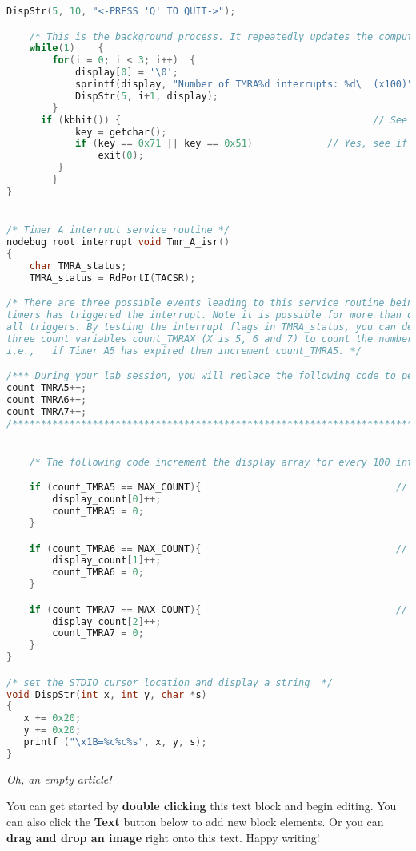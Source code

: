 \begin{lstlisting}[language=C]
   DispStr(5, 10, "<-PRESS 'Q' TO QUIT->");

	/* This is the background process. It repeatedly updates the computer monitor with the values in the display_count array */
	while(1)	{
		for(i = 0; i < 3; i++)	{
			display[0] = '\0';
			sprintf(display, "Number of TMRA%d interrupts: %d\  (x100)",i+5, display_count[i]);
			DispStr(5, i+1, display);
		}
      if (kbhit()) {											// See if key has been pressed
			key = getchar();
			if (key == 0x71 || key == 0x51)				// Yes, see if it's the q or Q key
				exit(0);
         }
 		}
}


/* Timer A interrupt service routine */
nodebug root interrupt void Tmr_A_isr()
{
	char TMRA_status;														// This will hold the interrupt flags
	TMRA_status = RdPortI(TACSR);										// Read interrupt flags and store to TMRA_status

/* There are three possible events leading to this service routine being called. Write code to determine which of the three
timers has triggered the interrupt. Note it is possible for more than one timer to expire at the same time, thus your code must service
all triggers. By testing the interrupt flags in TMRA_status, you can determine which counters have expired. Use
three count variables count_TMRAX (X is 5, 6 and 7) to count the number of interrupts. For each Timer AX interrupt you must increment the corresponding count variable.
i.e.,	if Timer A5 has expired then increment count_TMRA5. */

/*** During your lab session, you will replace the following code to perform as specified above ***/
count_TMRA5++;
count_TMRA6++;
count_TMRA7++;
/**************************************************************************************************/


	/* The following code increment the display array for every 100 interrupts for a respective timer, and resets the count variable */

	if (count_TMRA5 == MAX_COUNT){									// if Timer A5 has interrupted the CPU 100 times
		display_count[0]++;												// increment the display counter
		count_TMRA5 = 0;													// clear the Timer A5 counter
	}

	if (count_TMRA6 == MAX_COUNT){									// if Timer A6 has interrupted the CPU 100 times
		display_count[1]++;												// increment the display counter
		count_TMRA6 = 0;													// clear the Timer A6 counter
	}

	if (count_TMRA7 == MAX_COUNT){									// if Timer A6 has interrupted the CPU 100 times
		display_count[2]++;												// increment the display counter
		count_TMRA7 = 0;													// clear the Timer A6 counter
	}
}

/* set the STDIO cursor location and display a string  */
void DispStr(int x, int y, char *s)
{
   x += 0x20;
   y += 0x20;
   printf ("\x1B=%c%c%s", x, y, s);
}
\end{lstlisting}

\textit{Oh, an empty article!} 

You can get started by \textbf{double clicking} this text block and begin editing. You can also click the \textbf{Text} button below to add new block elements. Or you can \textbf{drag and drop an image} right onto this text. Happy writing!